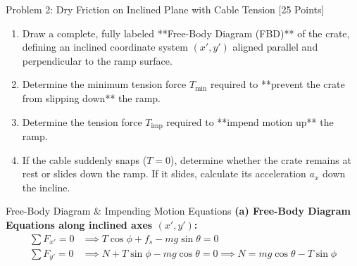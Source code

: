 \documentclass[11pt, a4paper, titlepage=false]{scrartcl}
\begin{document}
\begin{problembox}{Problem 2: Dry Friction on Inclined Plane with Cable Tension \hfill [25 Points]}
\begin{center}
        \label{fig:friction_diagram}
    \end{center}

    \begin{enumerate}[label=\alph*\lbrack\arabic*\rbrack, leftmargin=*, font=\bfseries\color{SecondaryTeal}]
        \item Draw a complete, fully labeled **Free-Body Diagram (FBD)** of the crate, defining an inclined coordinate system $(x', y')$ aligned parallel and perpendicular to the ramp surface.
        \item Determine the minimum tension force $T_{\min}$ required to **prevent the crate from slipping down** the ramp.
        \item Determine the tension force $T_{\text{imp}}$ required to **impend motion up** the ramp.
        \item If the cable suddenly snaps ($T = 0$), determine whether the crate remains at rest or slides down the ramp. If it slides, calculate its acceleration $a_x$ down the incline.
    \end{enumerate}
\end{problembox}

\begin{solutionworkspace}{Free-Body Diagram \& Impending Motion Equations}
    \textbf{(a) Free-Body Diagram Equations along inclined axes $(x', y')$:}
    \begin{align*}
        \sum F_{x'} = 0 &\implies T \cos\phi + f_s - mg \sin\theta = 0 \\
        \sum F_{y'} = 0 &\implies N + T \sin\phi - mg \cos\theta = 0 \implies N = mg \cos\theta - T \sin\phi
    \end{align*}

    \vspace{4.0cm} %
\end{solutionworkspace}
\end{document}
